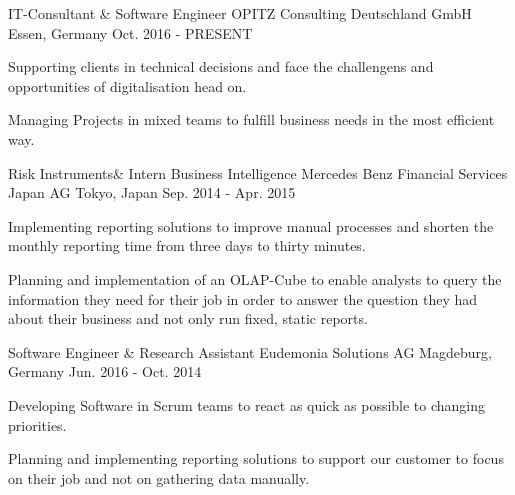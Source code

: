 

\begin{cventries}

  \cventry
    {IT-Consultant \& Software Engineer} %
    {OPITZ Consulting Deutschland GmbH} %
    {Essen, Germany} %
    {Oct. 2016 - PRESENT} %
    {
      \begin{cvitems} %
        \item{Supporting clients in technical decisions and face the challengens and opportunities of digitalisation head on.}
        \item{Managing Projects in mixed teams to fulfill business needs in the most efficient way.}
      \end{cvitems}
    }
  \cventry
    {Risk Instruments\& Intern Business Intelligence} %
    {Mercedes Benz Financial Services Japan AG} %
    {Tokyo, Japan} %
    {Sep. 2014 - Apr. 2015} %
    {
      \begin{cvitems} %
        \item{Implementing reporting solutions to improve manual processes and shorten the monthly reporting time from three days to thirty minutes.}
        \item{Planning and implementation of an OLAP-Cube to enable analysts to query the information they need for their job in order to answer the question they had about their business and not only run fixed, static reports.}
      \end{cvitems}
    }
\cventry
    {Software Engineer \& Research Assistant} %
    {Eudemonia Solutions AG} %
    {Magdeburg, Germany} %
    {Jun. 2016 - Oct. 2014} %
    {
      \begin{cvitems} %
        \item{Developing Software in Scrum teams to react as quick as possible to changing priorities.}
        \item{Planning and implementing reporting solutions to support our customer to focus on their job and not on gathering data manually.}
      \end{cvitems}
    }

\end{cventries}
